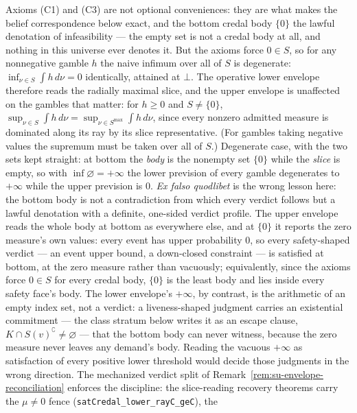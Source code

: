 \begin{remark}
\label{rem:su-maximal-slice}
Axioms (C1) and (C3) are not optional conveniences: they are what
makes the belief correspondence below exact, and the bottom credal
body $\{0\}$ the lawful denotation of
infeasibility --- the empty set is not a credal body at all, and
nothing in this universe ever denotes it. But the axioms force
$0 \in S$, so for any nonnegative
gamble $h$ the naive infimum over all of $S$ is degenerate:
$\inf_{\nu \in S} \int h \, d\nu = 0$ identically, attained at
$\bot$. The operative lower envelope therefore reads the radially
maximal slice, and the upper envelope is unaffected on the gambles
that matter: for $h \ge 0$ and $S \ne \{0\}$,
$\sup_{\nu \in S} \int h \, d\nu = \sup_{\nu \in S^{\max}} \int h \,
d\nu$, since every nonzero admitted measure is dominated along its
ray by its slice representative. (For gambles taking negative values
the supremum must be taken over all of $S$.) Degenerate case, with
the two sets kept straight: at
bottom the \emph{body} is the nonempty set $\{0\}$ while the
\emph{slice} is empty, so with $\inf \varnothing = +\infty$ the
lower prevision of every gamble degenerates to $+\infty$ while the
upper prevision is $0$. \emph{Ex falso quodlibet} is the wrong lesson here:
the bottom body is not a contradiction from which every verdict
follows but a lawful denotation with a definite, one-sided verdict
profile. The upper envelope reads the whole body at bottom as
everywhere else, and at $\{0\}$ it reports the zero measure's own
values: every event has upper probability $0$, so every
safety-shaped verdict --- an event upper bound, a down-closed
constraint --- is satisfied at bottom, at the zero measure
rather than vacuously; equivalently, since the axioms force
$0 \in S$ for every credal body, $\{0\}$ is the least body and lies
inside every safety face's body. The lower envelope's $+\infty$, by
contrast, is the arithmetic of an empty index set, not a verdict: a
liveness-shaped judgment carries an existential commitment --- the
class stratum below writes it as an escape clause,
$K \cap S(v)^{\complement} \neq \varnothing$ --- that the bottom
body can never witness, because the zero measure never leaves any
demand's body. Reading the vacuous $+\infty$ as satisfaction of
every positive lower threshold would decide those judgments in the
wrong direction. The mechanized verdict split of
Remark~\ref{rem:su-envelope-reconciliation} enforces the
discipline: the slice-reading recovery theorems carry the
$\mu \neq 0$ fence (\texttt{satCredal\_lower\_rayC\_geC}), the

\end{remark}
